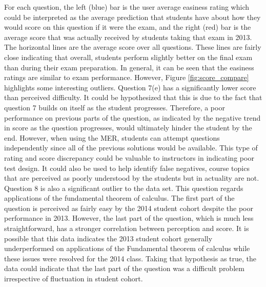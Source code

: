 \documentclass{primus}
\begin{document}
\noindent{}For each question, the left (blue) bar is the user average easiness rating which could be interpreted as the average prediction that students have about how they would score on this question if it were the exam, and the right (red) bar is the average score that was actually received by students taking that exam in 2013. The horizontal lines are the average score over all questions.  These lines are fairly close indicating that overall, students perform slightly better on the final exam than during their exam preparation. In general, it can be seen that the easiness ratings are similar to exam performance.  However, Figure \ref{fig:score_compare} highlights some interesting outliers.  Question 7(e) has a significantly lower score than perceived difficulty.  It could be hypothesized that this is due to the fact that question 7 builds on itself as the student progresses.  Therefore, a poor performance on previous parts of the question, as indicated by the negative trend in score as the question progresses, would ultimately hinder the student by the end.  However, when using the MER, students can attempt questions independently since all of the previous solutions would be available.  This type of rating and score discrepancy could be valuable to instructors in indicating poor test design.  It could also be used to help identify false negatives, course topics that are perceived as poorly understood by the students but in actuality are not.  Question 8 is also a significant outlier to the data set.  This question regards applications of the fundamental theorem of calculus.  The first part of the question is perceived as fairly easy by the 2014 student cohort despite the poor performance in 2013.  However, the last part of the question, which is much less straightforward, has a stronger correlation between perception and score.  It is possible that this data indicates the 2013 student cohort generally underperformed on applications of the Fundamental theorem of calculus while these issues were resolved for the 2014 class.  Taking that hypothesis as true, the data could indicate that the last part of the question was a difficult problem irrespective of fluctuation in student cohort.
\\\\
\end{document}
